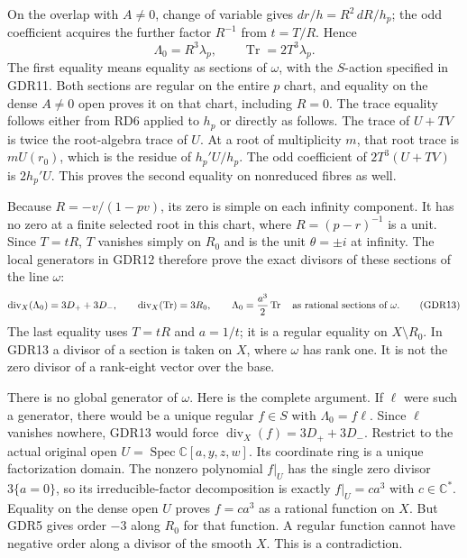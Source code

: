 \documentclass[10pt]{article}
\newcommand{\C}{\mathbb C}
\newcommand{\Spec}{\operatorname{Spec}}
\newcommand{\Div}{\operatorname{div}}
\newcommand{\Tr}{\operatorname{Tr}}
\begin{document}
On the overlap with $A\ne0$, change of variable gives
$dr/h=R^2\,dR/h_p$; the odd coefficient acquires the further
factor $R^{-1}$ from $t=T/R$. Hence
\begin{equation}
 \Lambda_0=R^3\lambda_p,\qquad
 \Tr=2T^3\lambda_p.
 \tag{GDR12}
\end{equation}
The first equality means equality as sections of $\omega$,
with the $S$-action specified in GDR11. Both sections are
regular on the entire $p$ chart, and equality on the dense
$A\ne0$ open proves it on that chart, including $R=0$.
The trace equality follows either from RD6 applied to $h_p$
or directly as follows. The trace of $U+TV$ is twice the
root-algebra trace of $U$. At a root of multiplicity $m$,
that root trace is $mU(r_0)$, which is the residue of
$h_p'U/h_p$. The odd coefficient of $2T^3(U+TV)$ is
$2h_p'U$. This proves the second equality on nonreduced
fibres as well.

Because $R=-v/(1-pv)$, its zero is simple on each infinity
component. It has no zero at a finite selected root in this
chart, where $R=(p-r)^{-1}$ is a unit. Since $T=tR$, $T$
vanishes simply on $R_0$ and is the unit $\theta=\pm i$ at
infinity. The local generators in GDR12 therefore prove
the exact divisors of these sections of the line $\omega$:
\begin{equation}
 \Div_X(\Lambda_0)=3D_++3D_-,\qquad
 \Div_X(\Tr)=3R_0,\qquad
 \Lambda_0=\frac{a^3}{2}\Tr
 \quad\hbox{as rational sections of }\omega.
 \tag{GDR13}
\end{equation}
The last equality uses $T=tR$ and $a=1/t$; it is a regular
equality on $X\setminus R_0$. In GDR13 a divisor of a section
is taken on $X$, where $\omega$ has rank one. It is not the
zero divisor of a rank-eight vector over the base.

There is no global generator of $\omega$. Here is the complete
argument. If $\ell$ were such a generator, there would be a
unique regular $f\in S$ with $\Lambda_0=f\ell$. Since $\ell$
vanishes nowhere, GDR13 would force
$\Div_X(f)=3D_++3D_-$. Restrict to the actual original open
$U=\Spec\C[a,y,z,w]$. Its coordinate ring is a unique
factorization domain. The nonzero polynomial $f|_U$ has the
single zero divisor $3\{a=0\}$, so its irreducible-factor
decomposition is exactly $f|_U=c a^3$ with $c\in\C^*$.
Equality on the dense open $U$ proves $f=c a^3$ as a rational
function on $X$. But GDR5 gives order $-3$ along $R_0$ for
that function. A regular function cannot have negative order
along a divisor of the smooth $X$. This is a contradiction.
\end{document}
